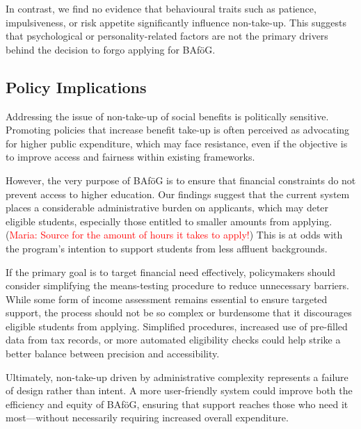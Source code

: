 In contrast, we find no evidence that behavioural traits such as patience, impulsiveness, or risk appetite significantly influence non-take-up. 
This suggests that psychological or personality-related factors are not the primary drivers behind the decision to forgo applying for BAföG.

%
%
\subsection{Policy Implications}
Addressing the issue of non-take-up of social benefits is politically sensitive. 
Promoting policies that increase benefit take-up is often perceived as advocating for higher public expenditure, which may face resistance, even if the objective is to improve access and fairness within existing frameworks.

However, the very purpose of BAföG is to ensure that financial constraints do not prevent access to higher education. 
Our findings suggest that the current system places a considerable administrative burden on applicants, which may deter eligible students, especially those entitled to smaller amounts from applying. 
(\textcolor{red}{Maria: Source for the amount of hours it takes to apply!})
This is at odds with the program's intention to support students from less affluent backgrounds.

If the primary goal is to target financial need effectively, policymakers should consider simplifying the means-testing procedure to reduce unnecessary barriers. 
While some form of income assessment remains essential to ensure targeted support, the process should not be so complex or burdensome that it discourages eligible students from applying. 
Simplified procedures, increased use of pre-filled data from tax records, or more automated eligibility checks could help strike a better balance between precision and accessibility.

Ultimately, non-take-up driven by administrative complexity represents a failure of design rather than intent. 
A more user-friendly system could improve both the efficiency and equity of BAföG, ensuring that support reaches those who need it most—without necessarily requiring increased overall expenditure.

%
%




%
%

%
%
